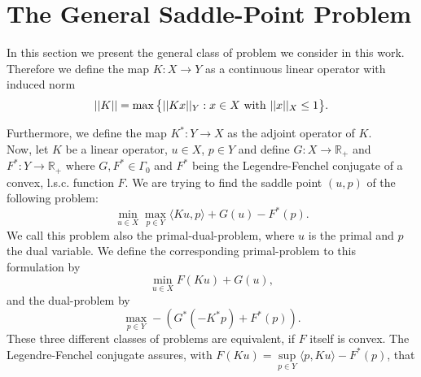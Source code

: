 \section{The General Saddle-Point Problem} %
\label{sec:the_general_saddle_point_problem}
    
    In this section we present the general class of problem we consider in this work. Therefore we define the map $K: X \longrightarrow Y$ as a continuous linear operator with induced norm
        \begin{equation}
            ||K|| = \max \big\{ ||Kx||_{Y} : x \in X \,\, \textnormal{with} \,\, ||x||_{X} \le 1 \big\}.
            \label{eq:operator_norm}
        \end{equation}

    Furthermore, we define the map $K^{\ast}: Y \longrightarrow X$ as the adjoint operator of $K$.\\
    Now, let $K$ be a linear operator, $u \in X$, $p \in Y$ and define $G: X \longrightarrow \mathbb{R}_{+}$ and $F^{\ast}: Y \longrightarrow \mathbb{R}_{+}$ where $G, F^{\ast} \in \Gamma_{0}$ and $F^{\ast}$ being the Legendre-Fenchel conjugate of a convex, l.s.c. function $F$. We are trying to find the saddle point $(u, p)$ of the following problem:
        \begin{equation}
            \min_{u \in X} \max_{p \in Y} \langle Ku, p \rangle + G(u) - F^{\ast}(p).
            \label{eq:the_saddle_point_problem}
        \end{equation}
    We call this problem also the primal-dual-problem, where $u$ is the primal and $p$ the dual variable. We define the corresponding primal-problem to this formulation by
        \begin{equation}
            \min_{u \in X} F(Ku) + G(u),
            \label{eq:primal_problem}
        \end{equation}
    and the dual-problem by
        \begin{equation}
            \max_{p \in Y} -(G^{\ast}(-K^{\ast}p) + F^{\ast}(p)).
            \label{eq:dual_problem}
        \end{equation}
    These three different classes of problems are equivalent, if $F$ itself is convex. The Legendre-Fenchel conjugate assures, with $F(Ku) = \sup\limits_{p \in Y} \langle p, Ku \rangle - F^{\ast}(p)$, that
